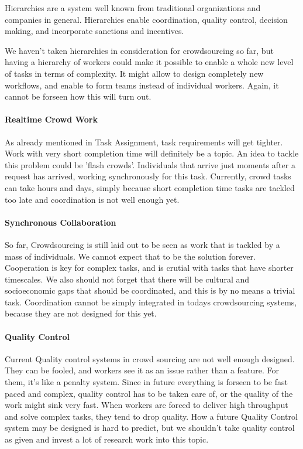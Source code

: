 \documentclass{sig-alternate}
\begin{document}
Hierarchies are a system well known from traditional organizations and companies in general. Hierarchies enable coordination, quality control, decision making, and incorporate sanctions and incentives.

We haven't taken hierarchies in consideration for crowdsourcing so far, but having a hierarchy of workers could make it possible to enable a whole new level of tasks in terms of complexity. It might allow to design completely new workflows, and enable to form teams instead of individual workers. Again, 
it cannot be forseen how this will turn out.

\paragraph{Realtime Crowd Work}

As already mentioned in Task Assignment, task requirements will get tighter. Work with very short completion time will definitely be a topic.
An idea to tackle this problem could be 'flash crowds'. Individuals that arrive just moments after a request has arrived, working synchronously for this task.
Currently, crowd tasks can take hours and days, simply because short completion time tasks are tackled too late and coordination is not well enough yet.

\paragraph{Synchronous Collaboration}

So far, Crowdsourcing is still laid out to be seen as work that is tackled by a mass of individuals. We cannot expect that to be the solution forever.
Cooperation is key for complex tasks, and is crutial with tasks that have shorter timescales. We also should not forget that there will be cultural and 
socioeconomic gaps that should be coordinated, and this is by no means a trivial task. Coordination cannot be simply integrated in todays crowdsourcing systems, because they are not designed for this yet.

\paragraph{Quality Control}

Current Quality control systems in crowd sourcing are not well enough designed. They can be fooled, and workers see it as an issue rather than a feature. For them, it's like a penalty system.
Since in future everything is forseen to be fast paced and complex, quality control has to be taken care of, or the quality of the work might sink very fast.
When workers are forced to deliver high throughput and solve complex tasks, they tend to drop quality. How a future Quality Control system may be designed is hard to predict, but we shouldn't take quality control as given and invest a lot of research work into this topic.








%

\end{document}
